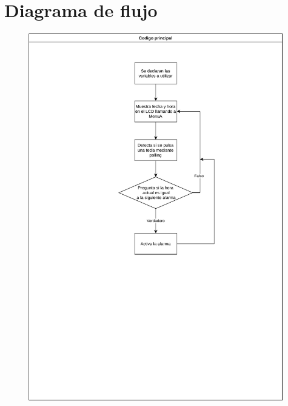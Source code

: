 \documentclass{article}
\begin{document}
\section{Diagrama de flujo}
\begin{figure}[H]
	\centering
	\includegraphics[width=0.99\textwidth]{flujo_setup.pdf}
\end{figure} 
\end{document}

